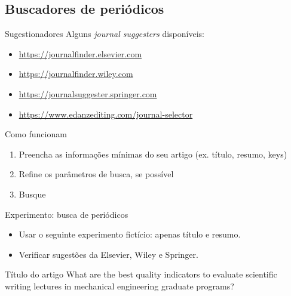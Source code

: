 \subsection{Buscadores de periódicos}

\begin{frame}{Sugestionadores}
Alguns \emph{journal suggesters} disponíveis: 
\begin{itemize}
\item \url{https://journalfinder.elsevier.com}
\item \url{https://journalfinder.wiley.com}
\item \url{https://journalsuggester.springer.com}
\item \url{https://www.edanzediting.com/journal-selector}
\end{itemize}
\end{frame}

\begin{frame}{Como funcionam}
\begin{enumerate}
\item Preencha as informações mínimas do seu artigo (ex. título, resumo, keys)
\item Refine os parâmetros de busca, se possível
\item Busque
\end{enumerate}
\end{frame}

\begin{frame}{Experimento: busca de periódicos}

\begin{itemize}
\item Usar o seguinte experimento fictício: apenas título e resumo.
\item Verificar sugestões da Elsevier, Wiley e Springer.
\end{itemize}

\begin{block}{Título do artigo}
What are the best quality indicators to evaluate scientific writing lectures in mechanical engineering graduate programs? 
\end{block}
\end{frame}

